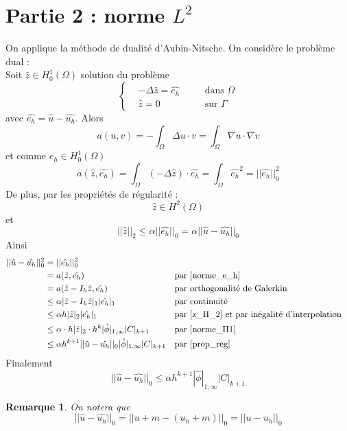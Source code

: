 \documentclass[french]{article}
\newtheorem*{Rem}{Remarque}
\begin{document}
	\section{Partie 2 : norme $L^2$}
	
	On applique la méthode de dualité d'Aubin-Nitsche. On considère le problème dual : \\
	Soit $\hat{z}\in H_0^1(\Omega)$ solution du problème
	$$\left\{\begin{aligned}
		&-\Delta\hat{z}=\hat{e_h} \quad &&\text{dans }\Omega \\
		&\hat{z}=0 \quad &&\text{sur } \Gamma
	\end{aligned}\right.$$
	avec $\hat{e_h}=\hat{u}-\hat{u_h}$.
	Alors
	$$a(u,v)=-\int_\Omega\Delta u\cdot v=\int_\Omega\nabla u\cdot\nabla v$$
	et comme $e_h\in H_0^1(\Omega)$
	\begin{equation}
		a(\hat{z},\hat{e_h})=\int_\Omega(-\Delta \hat{z})\cdot \hat{e_h}=\int_\Omega \hat{e_h}^2=||\hat{e_h}||_0^2
		\label{norme_e_h}
	\end{equation}
	De plus, par les propriétés de régularité : 
	\begin{equation}
		\hat{z}\in H^2(\Omega)
		\label{z_H_2}
	\end{equation}
	et
	\begin{equation}
		||\hat{z}||_2\le \alpha||\hat{e_h}||_0 =\alpha||\hat{u}-\hat{u_h}||_0
		\label{prop_reg}
	\end{equation}
	Ainsi
	\begin{align*}
		||\hat{u}-\hat{u_h}||_0^2&=||\hat{e_h}||_0^2 \\
		&=a(\hat{z},\hat{e_h}) &&\text{par \ref{norme_e_h}} \\
		&=a(\hat{z}-I_h\hat{z},\hat{e_h}) &&\text{par orthogonalité de Galerkin} \\
		&\le\alpha|\hat{z}-I_h\hat{z}|_1|\hat{e_h}|_1 &&\text{par continuité} \\
		&\le\alpha h|\hat{z}|_2|\hat{e_h}|_1 &&\text{par \ref{z_H_2} et par inégalité d'interpolation} \\
		&\le\alpha \cdot h|\hat{z}|_2 \cdot h^k|\hat{\phi}|_{1,\infty} |C|_{k+1} &&\text{par \ref{norme_H1}} \\
		&\le\alpha h^{k+1}||\hat{u}-\hat{u_h}||_0|\hat{\phi}|_{1,\infty} |C|_{k+1} &&\text{par \ref{prop_reg}}
	\end{align*}
	Finalement
	\begin{equation}
		\boxed{||\hat{u}-\hat{u_h}||_0\le\alpha h^{k+1}|\hat{\phi}|_{1,\infty} |C|_{k+1}}
	\end{equation}

	\begin{Rem}
		On notera que
		$$||\hat{u}-\hat{u_h}||_0=||u+m-(u_h+m)||_0=||u-u_h||_0$$
	\end{Rem}
\end{document}
